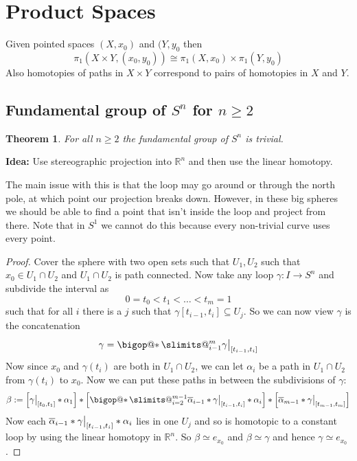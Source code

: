 \documentclass[11pt]{article}
\makeatletter
\newcommand{\defeq}{:=}
\newcommand\restr[2]{{%
  \left.\kern-\nulldelimiterspace %
  #1 %
  \vphantom{\big|} %
  \right|_{#2} %
  }}
\DeclareRobustCommand\bigop[1]{%
  \mathop{\vphantom{\sum}\mathpalette\bigop@{#1}}\slimits@
}
\newcommand{\bigop@}[2]{%
  \vcenter{%
    \sbox\z@{$#1\sum$}%
    \hbox{\resizebox{\ifx#1\displaystyle.9\fi\dimexpr\ht\z@+\dp\z@}{!}{$\m@th#2$}}%
  }%
}
\newcommand{\bigast}{\DOTSB\bigop{\ast}}
\newcommand{\R}{\mathbb{R}}
\newtheorem{theorem}{Theorem}[section]
\makeatother
\begin{document}
\section{Product Spaces}
Given pointed spaces $(X, x_0)$ and $(Y, y_0$ then
\[
	\pi_1(X\times Y, (x_0, y_0))\cong \pi_1(X, x_0)\times\pi_1(Y,y_0)
\]
Also homotopies of paths in $X\times Y$ correspond to pairs of homotopies in $X$ and $Y$.

\subsection{Fundamental group of $S^n$ for $n\geq 2$}
\begin{theorem}
For all $n\geq 2$ the fundamental group of $S^n$ is trivial.
\end{theorem}
\textbf{Idea: }Use stereographic projection into $\R^n$ and then use the linear homotopy.

The main issue with this is that the loop may go around or through the north pole, at which point our projection breaks down.
However, in these big spheres we should be able to find a point that isn't inside the loop and project from there.
Note that in $S^1$ we cannot do this because every non-trivial curve uses every point.
\begin{proof}
Cover the sphere with two open sets such that $U_1, U_2$ such that $x_0\in U_1\cap U_2$ and $U_1\cap U_2$ is path connected.
Now take any loop $\gamma:I\to S^n$ and subdivide the interval as
\[
0= t_0 < t_1 < \dots < t_m = 1
\]
such that for all $i$ there is a $j$ such that $\gamma[t_{i-1}, t_i]\subseteq U_j$.
So we can now view $\gamma$ is the concatenation
\[
	\gamma=\bigast_{i-1}^m \restr{\gamma}{[t_{i-1}, t_i]}
\]
Now since $x_0$ and $\gamma(t_i)$ are both in $U_1\cap U_2$, we can let $\alpha_i$ be a path in $U_1\cap U_2$ from $\gamma(t_i)$ to $x_0$.
Now we can put these paths in between the subdivisions of $\gamma$:
\[
	\beta\defeq \left[\restr{\gamma}{[t_0, t_1]}\ast\alpha_1\right]\ast\left[\bigast_{i=2}^{m-1} \overline{\alpha}_{i-1}\ast\restr{\gamma}{[t_{i-1}, t_i]}\ast \alpha_i\right]\ast \left[\overline{\alpha}_{m-1}\ast\restr{\gamma}{[t_{m-1}, t_m]}\right]
\]
Now each $\overline{\alpha}_{i-1}\ast\restr{\gamma}{[t_{i-1}, t_i]}\ast\alpha_i$ lies in one $U_j$ and so is homotopic to a constant loop by using the linear homotopy in $\R^n$.
So $\beta\simeq e_{x_0}$ and $\beta\simeq\gamma$ and hence $\gamma\simeq e_{x_0}$.
\end{proof}
\end{document}
